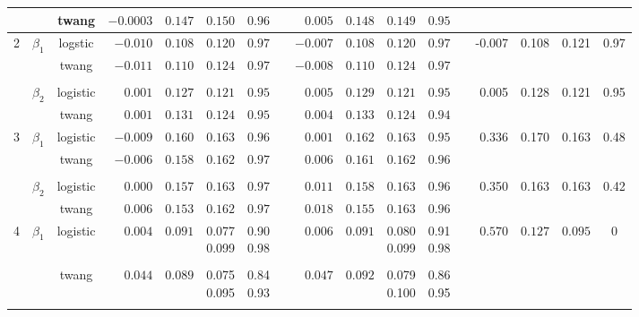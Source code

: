\documentclass[11pt]{article}
\begin{document}
\begin{table}[h]
\begin{center}
\begin{tabular}{cccrccccrccccrccc}
& &twang 
&$-0.0003$&$0.147$&$0.150$&$0.96$&&$0.005$&$0.148$&$0.149$&$0.95$ &&&&\tabularnewline 
\hline
\multirow{4}{*}{2}&\multirow{2}{*}{$\beta_1$}& logstic &$-0.010$&$0.108$&$0.120$&$0.97$&&$-0.007$&$0.108$&$0.120$&$0.97$
& \multirow{2}{*}{} & \multirow{2}{*}{-0.007} & \multirow{2}{*}{0.108} &  \multirow{2}{*}{0.121} & \multirow{2}{*}{0.97}\tabularnewline

&&twang 
&$-0.011$&$0.110$&$0.124$&$0.97$&&$-0.008$&$0.110$&$0.124$&$0.97$
&&&&&\tabularnewline
 \\[-1.5ex] 

&\multirow{2}{*}{$\beta_2$} & logistic 
&$ 0.001$&$0.127$&$0.121$&$0.95$&&$ 0.005$&$0.129$&$0.121$&$0.95$ 
&  \multirow{2}{*}{} & \multirow{2}{*}{0.005} & \multirow{2}{*}{0.128} &  \multirow{2}{*}{0.121} & \multirow{2}{*}{0.95}\tabularnewline

&&twang 
&$ 0.001$&$0.131$&$0.124$&$0.95$&&$ 0.004$&$0.133$&$0.124$&$0.94$ &&&&&\tabularnewline 
\hline
\multirow{4}{*}{3}& \multirow{2}{*}{$\beta_1$} & logistic 
&$-0.009$&$0.160$&$0.163$&$0.96$&&$ 0.001$&$0.162$&$0.163$&$0.95$
&  \multirow{2}{*}{} & \multirow{2}{*}{0.336} & \multirow{2}{*}{0.170} &  \multirow{2}{*}{0.163} & \multirow{2}{*}{0.48}\tabularnewline

& &twang 
&$-0.006$&$0.158$&$0.162$&$0.97$&&$ 0.006$&$0.161$&$0.162$&$0.96$
&&&&&\tabularnewline
 \\[-1.5ex] 

& \multirow{2}{*}{$\beta_2$} & logistic 
&$ 0.000$&$0.157$&$0.163$&$0.97$&&$ 0.011$&$0.158$&$0.163$&$0.96$ 
& \multirow{2}{*}{} & \multirow{2}{*}{0.350} & \multirow{2}{*}{0.163} &  \multirow{2}{*}{0.163} & \multirow{2}{*}{0.42}\tabularnewline

& & twang 
&$ 0.006$&$0.153$&$0.162$&$0.97$&&$ 0.018$&$0.155$&$0.163$&$0.96$ &&&&&\tabularnewline
\hline
\multirow{4}{*}{4}& \multirow{2}{*}{$\beta_1$} & logistic
&$0.004$ & $0.091$  & \Centerstack{0.077 \\ 0.099} & \Centerstack{0.90 \\ 0.98} &&$0.006$ & $0.091$  & \Centerstack{0.080\\ 0.099}  & \Centerstack{0.91\\0.98} 
& \multirow{2}{*}{} & \multirow{2}{*}{$0.570$} & \multirow{2}{*}{$0.127$} & \multirow{2}{*}{$0.095$} & \multirow{2}{*}{$0$}  \tabularnewline
 \\[-1.5ex] 
 
& & twang 
&$0.044$&$0.089$  & \Centerstack{0.075 \\ 0.095} & \Centerstack{0.84\\ 0.93} &&$0.047$ & $0.092$  & \Centerstack{0.079\\ 0.100}  & \Centerstack{0.86\\0.95} 
& &&  &&\tabularnewline 
\\[-1.5ex] 


\end{tabular}
\end{center}
\end{table}
\end{document}
